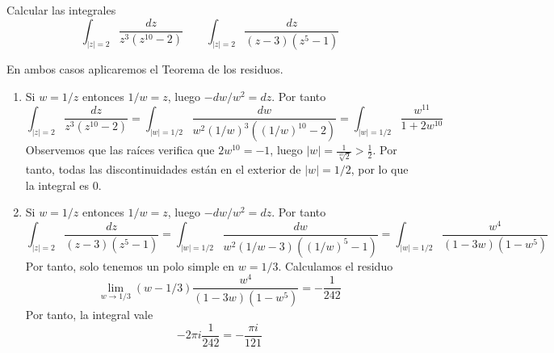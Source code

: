 \documentclass[twoside]{article}
\begin{document}
\newpage
\begin{ejercicio}{6}
Calcular las integrales
$$
\int_{|z|=2}\frac{dz}{z^3(z^{10}-2)} \qquad \int_{|z|=2}\frac{dz}{(z-3)(z^5-1)}
$$
\end{ejercicio}
\begin{solucion}
En ambos casos aplicaremos el Teorema de los residuos.
\begin{enumerate}
\item Si $w = 1/z$ entonces $1/w = z$, luego $-dw/w^2 = dz$. Por tanto 
$$
\int_{|z|=2}\frac{dz}{z^3(z^{10}-2)}= \int_{|w|=1/2} \frac{dw}{w^2 (1/w)^3((1/w)^{10}-2)} = \int_{|w|=1/2}\frac{w^{11}}{1+2w^{10}}
$$
Observemos que las raíces verifica que $2w^{10} = -1$, luego $|w| = \frac{1}{\sqrt[10]{2}} > \frac{1}{2}$. Por tanto, todas las discontinuidades están en el exterior de $|w|=1/2$, por lo que la integral es $0$.
\item Si $w = 1/z$ entonces $1/w = z$, luego $-dw/w^2 = dz$. Por tanto 
$$
\int_{|z|=2}\frac{dz}{(z-3)(z^5-1)}= \int_{|w|=1/2} \frac{dw}{w^2 (1/w-3)((1/w)^{5}-1)} = \int_{|w|=1/2}\frac{w^{4}}{(1-3w)(1-w^5)}
$$
Por tanto, solo tenemos un polo simple en $w=1/3$. Calculamos el residuo
$$
\lim_{w\to 1/3} (w-1/3)\frac{w^4}{(1-3w)(1-w^5)} = -\frac{1}{242}
$$
Por tanto, la integral vale
$$-2\pi i \frac{1}{242} = -\frac{\pi i}{121}$$
\end{enumerate}
\end{solucion}
\newpage
\end{document}

